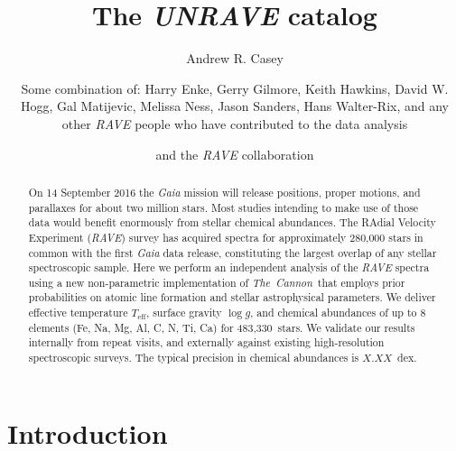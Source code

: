 \documentclass[preprint2,trackchanges]{aastex}
\newcommand{\project}[1]{\textsl{#1}}
\newcommand{\thecannon}{\project{The~Cannon}}
\newcommand{\logg}{\log g}
\newcommand{\teff}{T_{\mathrm{eff}}}
\newcommand{\Nstars}{483,330}
\begin{document}
\title{The \project{UNRAVE} catalog}

\author{Andrew R. Casey}

\author{Some combination of: Harry Enke, Gerry Gilmore, Keith Hawkins, David W. Hogg, Gal Matijevic, Melissa Ness, Jason Sanders, Hans Walter-Rix, and any other  \project{RAVE} people who have contributed to the data analysis}

\author{and the \project{RAVE} collaboration}

\begin{abstract}
On 14 September 2016 the \project{Gaia} mission will release positions, proper motions, and parallaxes for about two million stars.  Most studies intending to make use of those data would benefit enormously from stellar chemical abundances.  The RAdial Velocity Experiment (\project{RAVE}) survey has acquired spectra for approximately 280,000 stars in common with the first \project{Gaia} data release, constituting the largest overlap of any stellar spectroscopic sample.  Here we perform an independent analysis of the \project{RAVE} spectra using a new non-parametric implementation of \thecannon\ that employs prior probabilities on atomic line formation and stellar astrophysical parameters.  We deliver effective temperature $\teff$, surface gravity $\logg$, and chemical abundances of up to 8 elements (Fe, Na, Mg, Al, C, N, Ti, Ca) for \Nstars\ stars.  We validate our results internally from repeat visits, and externally against existing high-resolution spectroscopic surveys.  The typical precision in chemical abundances is $X.XX$~dex.  
\end{abstract}

\keywords{}

\section{Introduction} 
\label{sec:introduction}



\end{document}
